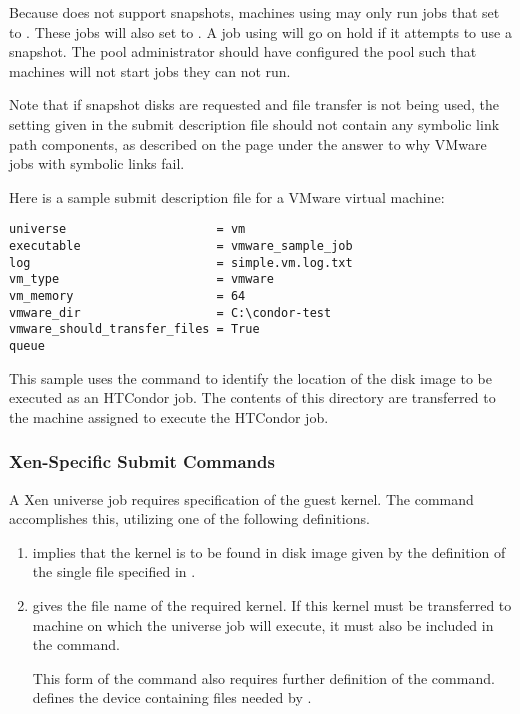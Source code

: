 Because  does not support snapshots, 
machines using  may only run  jobs
that set  to .
These jobs will also set
 to .
A job using  will go on hold if it attempts
to use a snapshot.
The pool administrator should have configured the pool
such that machines will not start jobs they can not run.

Note that if snapshot disks are requested and file transfer is not
being used, the  setting given in 
the submit description file
should not contain any symbolic link path components,
as described on the
page under the answer to why VMware jobs with symbolic links fail.

Here is a sample submit description file for a VMware virtual machine:
\begin{verbatim}
universe                     = vm
executable                   = vmware_sample_job
log                          = simple.vm.log.txt
vm_type                      = vmware
vm_memory                    = 64
vmware_dir                   = C:\condor-test
vmware_should_transfer_files = True
queue
\end{verbatim}
This sample uses the  command to identify
the location of the disk image to be executed as an HTCondor job.
The contents of this directory are transferred to the machine assigned
to execute the HTCondor job.

\subsubsection{\label{sec:vm-Xensubmitfile}Xen-Specific Submit Commands}

A Xen  universe job requires specification of the
guest kernel. 
The  command accomplishes this, 
utilizing one of the following definitions.
\begin{enumerate}
\item {} implies that the kernel
  is to be found in disk image given by the definition of the single file
  specified in . 

\item {} gives the
  file name of the required kernel.  If this kernel must be transferred
  to machine on which the  universe job will execute,
  it must also be included in the  command. 

  This form of the  command also requires further
  definition of the  command.
   defines the device containing files needed by
  .

\end{enumerate}

